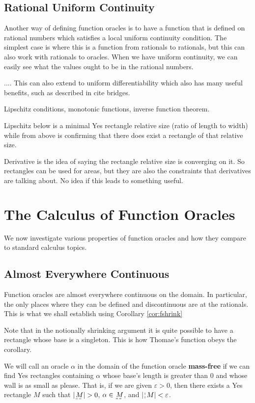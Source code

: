 \documentclass[12pt]{article}
\begin{document}
\subsection{Rational Uniform Continuity}

Another way of defining function oracles is to have a function that is defined on rational numbers which satisfies a local uniform continuity condition. The simplest case is where this is a function from rationals to rationals, but this can also work with rationals to oracles. When we have uniform continuity, we can easily see what the values ought to be in the rational numbers. 

....
This can also extend to uniform differentiability which also has many useful benefits, such as described in cite bridges. 


Lipschitz conditions, monotonic functions, inverse function theorem. 

Lipschitz below is a minimal Yes rectangle relative size (ratio of length to width) while from above is confirming that there does exist a rectangle of that relative size. 

Derivative is the idea of saying the rectangle relative size is converging on it. So rectangles can be used for areas, but they are also the constraints that derivatives are talking about. No idea if this leads to something useful. 


\section{The Calculus of Function Oracles}

We now investigate various properties of function oracles and how they compare to standard calculus topics. 

\subsection{Almost Everywhere Continuous}

Function oracles are almost everywhere continuous on the domain. In particular, the only places where they can be defined and discontinuous are at the rationals. This is what we shall establish using Corollary \ref{cor:fshrink}

Note that in the notionally shrinking argument it is quite possible to have a rectangle whose base is a singleton. This is how Thomae's function obeys the corollary. 

We will call an oracle $\alpha$ in the domain of the function oracle \textbf{mass-free} if we can find Yes rectangles containing $\alpha$ whose base's length is greater than 0 and whose wall is as small as please. That is, if we are given $\varepsilon > 0$, then there exists a Yes rectangle $M$ such that $|\base{M}| > 0$, $\alpha \in \base{M}$, and $|\wall{M}| < \varepsilon$.
 
\end{document}
